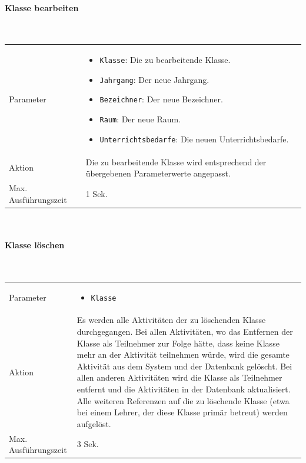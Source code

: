 \documentclass[fontsize=12pt,paper=a4,twoside]{scrartcl}
\begin{document}
\paragraph{Klasse bearbeiten}\mbox{}\\

\begin{tabularx}{\textwidth}{p{4cm}X}
Parameter & \begin{itemize}[itemsep=0pt, leftmargin = 0.5cm]
			\item \texttt{Klasse}: Die zu bearbeitende Klasse.
			\item \texttt{Jahrgang}: Der neue Jahrgang.
			\item \texttt{Bezeichner}: Der neue Bezeichner.
			\item \texttt{Raum}: Der neue Raum.
			\item \texttt{Unterrichtsbedarfe}: Die neuen Unterrichtsbedarfe.
			\end{itemize}\\
Aktion & Die zu bearbeitende Klasse wird entsprechend der übergebenen Parameterwerte angepasst. \\
Max. Ausführungszeit & 1 Sek. 
\end{tabularx}\\


\paragraph{Klasse löschen}\mbox{}\\

\begin{tabularx}{\textwidth}{p{4cm}X}
Parameter & \begin{itemize}[itemsep=0pt, leftmargin = 0.5cm]
			\item \texttt{Klasse}
			\end{itemize}\\
Aktion & Es werden alle Aktivitäten der zu löschenden Klasse durchgegangen. Bei allen Aktivitäten, wo das Entfernen der Klasse als Teilnehmer zur Folge hätte, dass keine Klasse mehr an der Aktivität teilnehmen würde, wird die gesamte Aktivität aus dem System und der Datenbank gelöscht. Bei allen anderen Aktivitäten wird die Klasse als Teilnehmer entfernt und die Aktivitäten in der Datenbank aktualisiert. Alle weiteren Referenzen  auf die zu löschende Klasse (etwa bei einem Lehrer, der diese Klasse primär betreut) werden aufgelöst. \\
Max. Ausführungszeit & 3 Sek. 
\end{tabularx}\\
\end{document}
